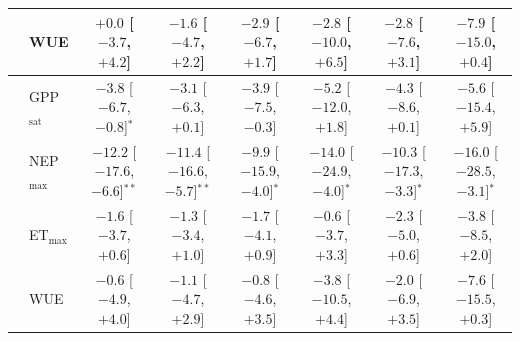 \begin{table}[p]
{\begin{tabular}{llcccccc}
 & WUE & $+0.0$ {\tiny[$-3.7$, $+4.2$]} & $-1.6$ {\tiny[$-4.7$, $+2.2$]} & $-2.9$ {\tiny[$-6.7$, $+1.7$]} & $-2.8$ {\tiny[$-10.0$, $+6.5$]} & $-2.8$ {\tiny[$-7.6$, $+3.1$]} & $-7.9$ {\tiny[$-15.0$, $+0.4$]} \\
\midrule
{} & GPP$_\mathrm{sat}$ & $-3.8$ {\tiny[$-6.7$, $-0.8$]}$^{*}$ & $-3.1$ {\tiny[$-6.3$, $+0.1$]} & $-3.9$ {\tiny[$-7.5$, $-0.3$]} & $-5.2$ {\tiny[$-12.0$, $+1.8$]} & $-4.3$ {\tiny[$-8.6$, $+0.1$]} & $-5.6$ {\tiny[$-15.4$, $+5.9$]} \\
 & NEP$_\mathrm{max}$ & $-12.2$ {\tiny[$-17.6$, $-6.6$]}$^{**}$ & $-11.4$ {\tiny[$-16.6$, $-5.7$]}$^{**}$ & $-9.9$ {\tiny[$-15.9$, $-4.0$]}$^{*}$ & $-14.0$ {\tiny[$-24.9$, $-4.0$]}$^{*}$ & $-10.3$ {\tiny[$-17.3$, $-3.3$]}$^{*}$ & $-16.0$ {\tiny[$-28.5$, $-3.1$]}$^{*}$ \\
 & ET$_\mathrm{max}$ & $-1.6$ {\tiny[$-3.7$, $+0.6$]} & $-1.3$ {\tiny[$-3.4$, $+1.0$]} & $-1.7$ {\tiny[$-4.1$, $+0.9$]} & $-0.6$ {\tiny[$-3.7$, $+3.3$]} & $-2.3$ {\tiny[$-5.0$, $+0.6$]} & $-3.8$ {\tiny[$-8.5$, $+2.0$]} \\
 & WUE & $-0.6$ {\tiny[$-4.9$, $+4.0$]} & $-1.1$ {\tiny[$-4.7$, $+2.9$]} & $-0.8$ {\tiny[$-4.6$, $+3.5$]} & $-3.8$ {\tiny[$-10.5$, $+4.4$]} & $-2.0$ {\tiny[$-6.9$, $+3.5$]} & $-7.6$ {\tiny[$-15.5$, $+0.3$]} \\
\bottomrule
\end{tabular}}
\end{table}
